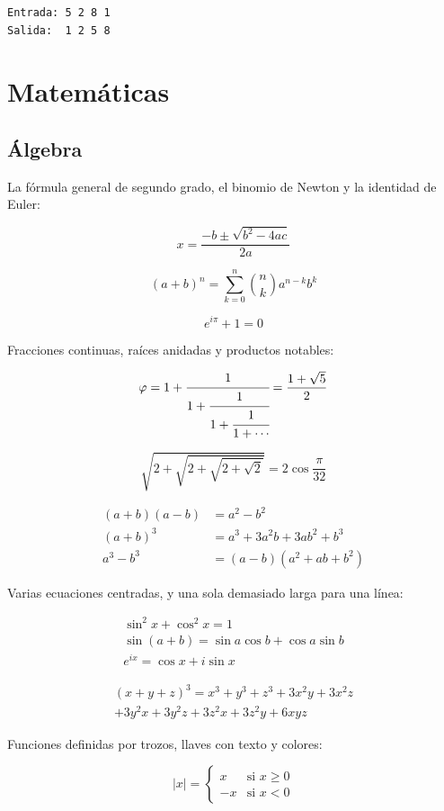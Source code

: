 \begin{lstlisting}[numbers=none]
Entrada: 5 2 8 1
Salida:  1 2 5 8
\end{lstlisting}

\section{Matemáticas}

\subsection{Álgebra}

La fórmula general de segundo grado, el binomio de Newton y la identidad de Euler:

\[ x=\frac{-b\pm\sqrt{b^2-4ac}}{2a} \]

\[ (a+b)^n=\sum_{k=0}^{n}\binom{n}{k}a^{n-k}b^k \]

\[ e^{i\pi}+1=0 \]

Fracciones continuas, raíces anidadas y productos notables:

\[ \varphi=1+\cfrac{1}{1+\cfrac{1}{1+\cfrac{1}{1+\cdots}}}=\frac{1+\sqrt{5}}{2} \]

\[ \sqrt{2+\sqrt{2+\sqrt{2+\sqrt{2}}}}=2\cos\frac{\pi}{32} \]

\begin{align*}
(a+b)(a-b) &= a^2-b^2 \\
(a+b)^3 &= a^3+3a^2b+3ab^2+b^3 \\
a^3-b^3 &= (a-b)(a^2+ab+b^2)
\end{align*}

Varias ecuaciones centradas, y una sola demasiado larga para una línea:

\begin{gather*}
\sin^2 x+\cos^2 x=1 \\
\sin(a+b)=\sin a\cos b+\cos a\sin b \\
e^{ix}=\cos x+i\sin x
\end{gather*}

\begin{multline*}
(x+y+z)^3=x^3+y^3+z^3+3x^2y+3x^2z \\
+3y^2x+3y^2z+3z^2x+3z^2y+6xyz
\end{multline*}

Funciones definidas por trozos, llaves con texto y colores:

\[ |x|=\begin{cases} x & \text{si } x\ge 0 \\ -x & \text{si } x<0 \end{cases} \]

